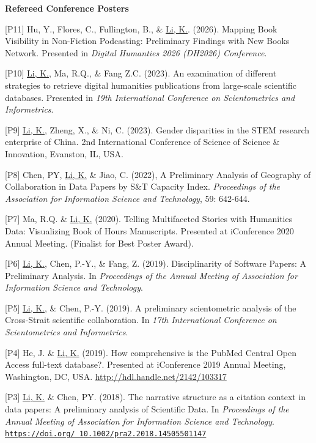 \documentclass[margin, 10pt]{res} %
\begin{document}
\begin{resume}
\textbf{Refereed Conference Posters}

[P11] Hu, Y., Flores, C., Fullington, B., \& \underline{Li, K.}. (2026). Mapping Book Visibility in Non-Fiction Podcasting: Preliminary Findings with New Books Network. Presented in \textit{Digital Humanties 2026 (DH2026) Conference}.

[P10] \underline{Li, K.}, Ma, R.Q., \& Fang Z.C. (2023). An examination of different strategies to retrieve digital humanities publications from large-scale scientific databases. Presented in \textit{19th International Conference on Scientometrics and Informetrics}.

[P9] \underline{Li, K.}, Zheng, X., \& Ni, C. (2023). Gender disparities in the STEM research enterprise of China. 2nd International Conference of Science of Science \& Innovation, Evanston, IL, USA.

[P8] Chen, PY, \underline{Li, K.} \& Jiao, C. (2022), A Preliminary Analysis of Geography of Collaboration in Data Papers by S\&T Capacity Index. \textit{Proceedings of the Association for Information Science and Technology}, 59: 642-644.

[P7] Ma, R.Q. \& \underline{Li, K.} (2020). Telling Multifaceted Stories with Humanities Data: Visualizing Book of Hours Manuscripts. Presented at iConference 2020 Annual Meeting. (Finalist for Best Poster Award).

[P6] \underline{Li, K.}, Chen, P.-Y., \& Fang, Z. (2019). Disciplinarity of Software Papers: A Preliminary Analysis. In \textit{Proceedings of the Annual Meeting of Association for Information Science and Technology}.

[P5] \underline{Li, K.}, \& Chen, P.-Y. (2019). A preliminary scientometric analysis of the Cross-Strait scientific collaboration. In \textit{17th International Conference on Scientometrics and Informetrics}.

[P4] He, J. \& \underline{Li, K.} (2019). How comprehensive is the PubMed Central Open Access full-text database?. Presented at iConference 2019 Annual Meeting, Washington, DC, USA. \href{http://hdl.handle.net/2142/103317}{http://hdl.handle.net/2142/103317}

[P3] \underline{Li, K.} \& Chen, PY. (2018). The narrative structure as a citation context in data papers: A preliminary analysis of Scientific Data. In \textit{Proceedings of the Annual Meeting of Association for Information Science and Technology}. \href{https://doi.org/10.1002/pra2.2018.14505501147}{\nolinkurl{https://doi.org/ 10.1002/pra2.2018.14505501147}}


\end{resume}
\end{document}
